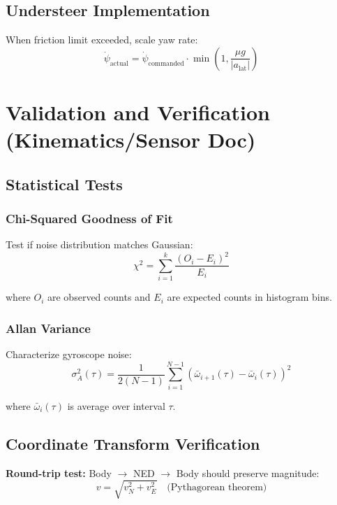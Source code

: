\documentclass[11pt,a4paper]{article}
\begin{document}
\subsection{Understeer Implementation}

When friction limit exceeded, scale yaw rate:
\begin{equation}
\dot{\psi}_{\text{actual}} = \dot{\psi}_{\text{commanded}} \cdot \min\left(1, \frac{\mu g}{|a_{\text{lat}}|}\right)
\end{equation}

\section{Validation and Verification (Kinematics/Sensor Doc)}

\subsection{Statistical Tests}

\subsubsection{Chi-Squared Goodness of Fit}

Test if noise distribution matches Gaussian:
\begin{equation}
\chi^2 = \sum_{i=1}^{k} \frac{(O_i - E_i)^2}{E_i}
\end{equation}

where $O_i$ are observed counts and $E_i$ are expected counts in histogram bins.

\subsubsection{Allan Variance}

Characterize gyroscope noise:
\begin{equation}
\sigma_A^2(\tau) = \frac{1}{2(N-1)} \sum_{i=1}^{N-1} \left( \bar{\omega}_{i+1}(\tau) - \bar{\omega}_i(\tau) \right)^2
\end{equation}

where $\bar{\omega}_i(\tau)$ is average over interval $\tau$.

\subsection{Coordinate Transform Verification}

\textbf{Round-trip test:} Body $\to$ NED $\to$ Body should preserve magnitude:
\begin{equation}
v = \sqrt{v_N^2 + v_E^2} \quad \text{(Pythagorean theorem)}
\end{equation}
\end{document}
